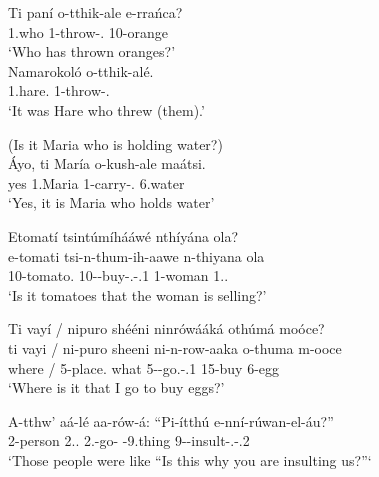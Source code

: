 \documentclass[output=paper]{langscibook}
\begin{document}
\ea
\label{bkm:Ref96955103}
\ea
\label{bkm:Ref96955103:a}
\gll
Ti  paní  o-tthik-ale  e-rrańca?\\
\COP{}  1.who  1-throw-\PFV{}.\REL{}  10-orange\\
\glt
‘Who has thrown oranges?’\\

\ex
\label{bkm:Ref96955103:b}
\gll
Namarokoló  o-tthik-alé.\\
1.hare.\PRL{}  1-throw-\PFV{}.\REL{}\\
\glt
‘It was Hare who threw (them).’ \citep[172]{vanderWal2009a}\\

\z
\z

\ea
(Is it Maria who is holding water?)\\
\gll
Áyo,  ti  María  o-kush-ale  maátsi.\\
yes  \COP{}  1.Maria  1-carry-\PFV{}.\REL{}  6.water\\
\glt
‘Yes, it is Maria who holds water’\\


\z

\ea
\label{bkm:Ref95918424}
Etomatí tsintúmíhááwé nthíyána ola?\\
\gll
e-tomati  tsi-n-thum-ih-aawe  n-thiyana  ola\\
10-tomato.\PRL{}  10-\PRS{}-buy-\CAUS{}.\REL{}-\POSS{}.1  1-woman  1.\DEM{}.\PROX{}\\
\glt
‘Is it tomatoes that the woman is selling?’\\


\z

\ea
\label{bkm:Ref95918470}
Ti vayí / nipuro shééni ninrówááká othúmá moóce?\\
\gll
ti  vayi /  ni-puro  sheeni  ni-n-row-aaka  o-thuma  m-ooce\\
\COP{}  where /  5-place.\PRL{}  what  5-\PRS{}-go.\REL{}-\POSS{}.1\SG{}  15-buy  6-egg\\
\glt
‘Where is it that I go to buy eggs?’\\


\z

\ea
\label{bkm:Ref96769425}
\gll
A-tthw’  aá-lé  aa-rów-á:  “Pi-ítthú  e-nní-rúwan-el-áu?”\\
2-person  2.\DEM{}.\DIST{}  2\SM{}.\IPFV{}-go-\FV{}  \COP{}-9.thing  9-\HAB{}-insult-\APPL{}.\REL{}-\POSS{}.2\SG{}\\
\glt
‘Those people were like “Is this why you are insulting us?”‘\\
\end{document}

